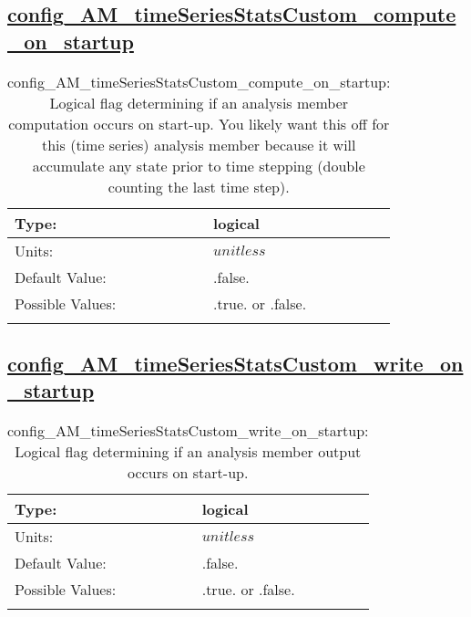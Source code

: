 \subsection[config\_AM\_timeSeriesStatsCustom\_compute\_on\_startup]{\hyperref[sec:nm_tab_AM_timeSeriesStatsCustom]{config\_AM\_timeSeriesStatsCustom\_compute\_on\_startup}}
\label{subsec:nm_sec_config_AM_timeSeriesStatsCustom_compute_on_startup}
\begin{center}
\begin{longtable}{| p{2.0in} || p{4.0in} |}
    \hline
    Type: & logical \\
    \hline
    Units: & $unitless$ \\
    \hline
    Default Value: & .false. \\
    \hline
    Possible Values: & .true. or .false. \\
    \hline
    \caption{config\_AM\_timeSeriesStatsCustom\_compute\_on\_startup: Logical flag determining if an analysis member computation occurs on start-up. You likely want this off for this (time series) analysis member because it will accumulate any state prior to time stepping (double counting the last time step).}
\end{longtable}
\end{center}
\subsection[config\_AM\_timeSeriesStatsCustom\_write\_on\_startup]{\hyperref[sec:nm_tab_AM_timeSeriesStatsCustom]{config\_AM\_timeSeriesStatsCustom\_write\_on\_startup}}
\label{subsec:nm_sec_config_AM_timeSeriesStatsCustom_write_on_startup}
\begin{center}
\begin{longtable}{| p{2.0in} || p{4.0in} |}
    \hline
    Type: & logical \\
    \hline
    Units: & $unitless$ \\
    \hline
    Default Value: & .false. \\
    \hline
    Possible Values: & .true. or .false. \\
    \hline
    \caption{config\_AM\_timeSeriesStatsCustom\_write\_on\_startup: Logical flag determining if an analysis member output occurs on start-up.}
\end{longtable}
\end{center}
